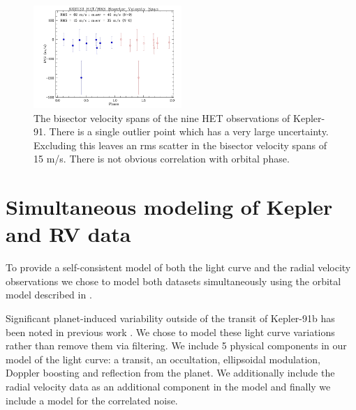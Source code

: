 \documentclass[apjl]{emulateapj}
\begin{document}

\begin{figure}
\includegraphics[width=0.50\textwidth]{k02133_bvs_phas1.jpg}
\caption{The bisector velocity spans of the nine HET observations of Kepler-91. There is a single outlier point which has a very large uncertainty. Excluding this leaves an rms scatter in the bisector velocity spans of 15 m/s. There is not obvious correlation with orbital phase.}
\label{fig:bisectors}
\end{figure}


\section{Simultaneous modeling of Kepler and RV data}
To provide a self-consistent model of both the light curve and the radial velocity observations we chose to model both datasets simultaneously using the orbital model described in \citet{rowe14}.

Significant planet-induced variability outside of the transit of Kepler-91b has been noted in previous work \citep{lillo13,esteves13}. We chose to model these light curve variations rather than remove them via filtering.  We include 5 physical components in our model of the light curve: a transit, an occultation, ellipsoidal modulation, Doppler boosting and reflection from the planet. We additionally include the radial velocity data as an additional component in the model and finally we include a model for the correlated noise.
\end{document}
